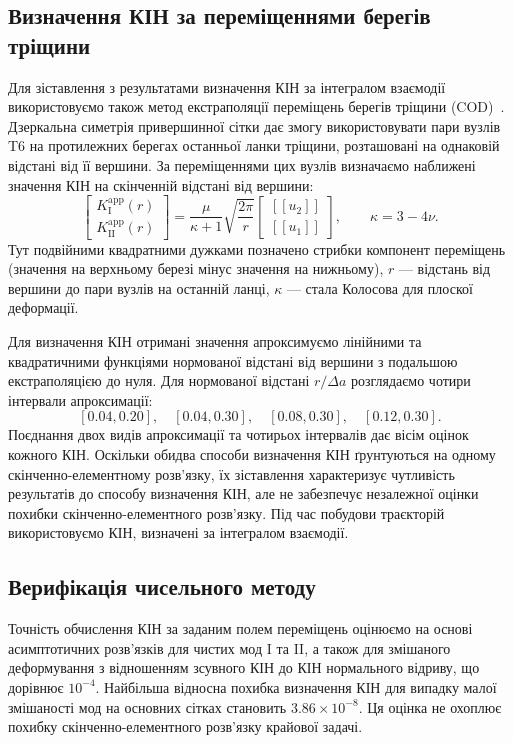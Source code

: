 \documentclass[a4paper,12pt]{article}
\newcommand{\SyntheticRelativeError}{3.86\times10^{-8}}
\begin{document}
\subsection{Визначення КІН за переміщеннями берегів тріщини}
\label{sec:cod-extraction}
Для зіставлення з результатами визначення КІН за інтегралом взаємодії використовуємо також
метод екстраполяції переміщень берегів тріщини (COD)~\cite{GuineaPlanasElices2000}.
Дзеркальна симетрія привершинної сітки дає змогу використовувати пари вузлів T6 на протилежних
берегах останньої ланки тріщини, розташовані на однаковій відстані від її вершини.
За переміщеннями цих вузлів визначаємо наближені значення КІН на скінченній відстані від вершини:
\begin{equation}
 \begin{bmatrix}K_{\mathrm I}^{\mathrm{app}}(r)\\K_{\mathrm{II}}^{\mathrm{app}}(r)\end{bmatrix}
 =\frac{\mu}{\kappa+1}\sqrt{\frac{2\pi}{r}}
 \begin{bmatrix}{[\![u_2]\!]}\\{[\![u_1]\!]}\end{bmatrix},
 \qquad \kappa=3-4\nu.
 \label{eq:cod}
\end{equation}
Тут подвійними квадратними дужками позначено стрибки компонент переміщень (значення
на верхньому березі мінус значення на нижньому), $r$ --- відстань від вершини до пари вузлів
на останній ланці, $\kappa$ --- стала Колосова для плоскої деформації.

Для визначення КІН отримані значення апроксимуємо лінійними та квадратичними функціями
нормованої відстані від вершини з подальшою екстраполяцією до нуля. Для нормованої відстані $r/\Delta a$ розглядаємо чотири інтервали апроксимації:
\[
 [0.04,0.20],\quad [0.04,0.30],\quad [0.08,0.30],\quad [0.12,0.30].
\]
Поєднання двох видів апроксимації та чотирьох інтервалів дає вісім оцінок кожного КІН.
Оскільки обидва способи визначення КІН ґрунтуються на одному скінченно-елементному розв’язку,
їх зіставлення характеризує чутливість результатів до способу визначення КІН, але не забезпечує
незалежної оцінки похибки скінченно-елементного розв’язку. Під час побудови траєкторій використовуємо
КІН, визначені за інтегралом взаємодії.

\subsection{Верифікація чисельного методу}
Точність обчислення КІН за заданим полем переміщень оцінюємо на основі асимптотичних
розв’язків для чистих мод I та II, а також для змішаного деформування з відношенням
зсувного КІН до КІН нормального відриву, що дорівнює $10^{-4}$.
Найбільша відносна похибка визначення КІН для випадку малої змішаності мод на основних
сітках становить $\SyntheticRelativeError$. Ця оцінка не охоплює похибку
скінченно-елементного розв’язку крайової задачі.
\end{document}
